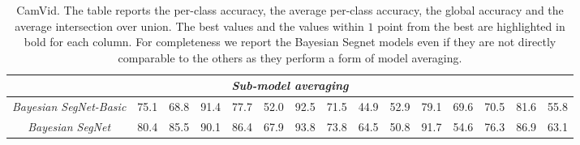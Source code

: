 \begin{table}[!ht]
{{\begin{tabular}{c|c|c|c|c|c|c|c|c|c|c|c||c|c|c}
				\multicolumn{15}{c}{\emph{Sub-model averaging}} \\ \hline
                \emph{Bayesian SegNet-Basic} \cite{Kendall2015bayesiansegnet} & 75.1 & 68.8 & 91.4 & 77.7 & 52.0 & 92.5 & 71.5 & 44.9 & 52.9 & 79.1 & 69.6 & 70.5 & 81.6 & 55.8 \\ \hline
                \emph{Bayesian SegNet} \cite{Kendall2015bayesiansegnet} & 80.4 & 85.5 & 90.1 & 86.4 & 67.9 & 93.8 & 73.8 & 64.5 & 50.8 & 91.7 & 54.6 & 76.3 & 86.9 & 63.1 \\ \hline

			\end{tabular}
		}
    }
	\vspace*{0.1cm}
    \caption{%
        CamVid. The table reports the per-class accuracy, the average per-class
        accuracy, the global accuracy and the average intersection over union.
        The best values and the values within $1$ point from the best are
        highlighted in bold for each column. For completeness we report the
        Bayesian Segnet models even if they are not directly comparable to the
        others as they perform a form of model averaging.}
    \label{tbl:camvid_SOTA}
\end{table}

